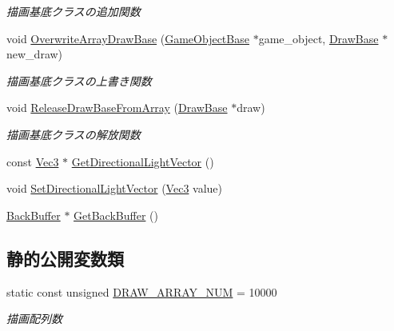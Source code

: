 \begin{DoxyCompactItemize}
\begin{DoxyCompactList}\small\item\em 描画基底クラスの追加関数 \end{DoxyCompactList}\item 
void \mbox{\hyperlink{class_draw_manager_a94ef5a241c8d78187a2a6c0ed3c9efec}{Overwrite\+Array\+Draw\+Base}} (\mbox{\hyperlink{class_game_object_base}{Game\+Object\+Base}} $\ast$game\+\_\+object, \mbox{\hyperlink{class_draw_base}{Draw\+Base}} $\ast$new\+\_\+draw)
\begin{DoxyCompactList}\small\item\em 描画基底クラスの上書き関数 \end{DoxyCompactList}\item 
void \mbox{\hyperlink{class_draw_manager_a287d1f359b87f075b22df6a9b6e99316}{Release\+Draw\+Base\+From\+Array}} (\mbox{\hyperlink{class_draw_base}{Draw\+Base}} $\ast$draw)
\begin{DoxyCompactList}\small\item\em 描画基底クラスの解放関数 \end{DoxyCompactList}\item 
const \mbox{\hyperlink{_vector3_d_8h_ab16f59e4393f29a01ec8b9bbbabbe65d}{Vec3}} $\ast$ \mbox{\hyperlink{class_draw_manager_a952023ad9e2e12844c93e37029a32700}{Get\+Directional\+Light\+Vector}} ()
\item 
void \mbox{\hyperlink{class_draw_manager_a470edae8248d36956a02bab7e59a4140}{Set\+Directional\+Light\+Vector}} (\mbox{\hyperlink{_vector3_d_8h_ab16f59e4393f29a01ec8b9bbbabbe65d}{Vec3}} value)
\item 
\mbox{\hyperlink{class_back_buffer}{Back\+Buffer}} $\ast$ \mbox{\hyperlink{class_draw_manager_a0e7e11e650f1c1736e9d3199a58191a7}{Get\+Back\+Buffer}} ()
\end{DoxyCompactItemize}
\subsection*{静的公開変数類}
\begin{DoxyCompactItemize}
\item 
static const unsigned \mbox{\hyperlink{class_draw_manager_ad4326cddcb1cc4cec198c4f8069b81f0}{D\+R\+A\+W\+\_\+\+A\+R\+R\+A\+Y\+\_\+\+N\+UM}} = 10000
\begin{DoxyCompactList}\small\item\em 描画配列数 \end{DoxyCompactList}\end{DoxyCompactItemize}


